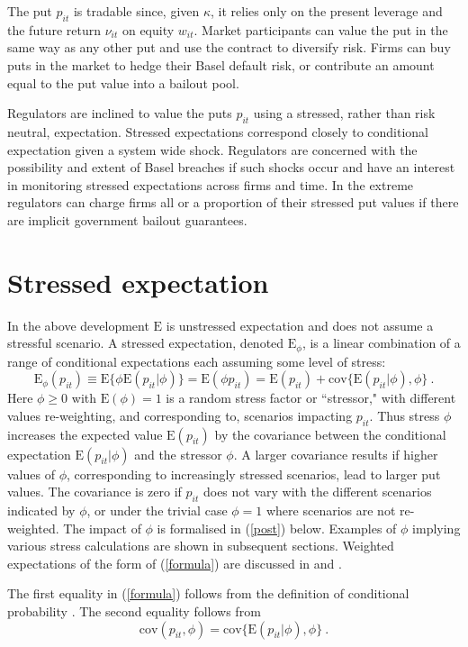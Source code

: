 \documentclass[12pt]{article}
\newcommand{\E}{\mathrm{E}}
\newcommand{\cov}{\mathrm{cov}}
\newcommand{\Es}{\E_\phi}
\newcommand{\eref}[1]{(\ref{#1})}
\newcommand{\be}[1]{\begin{equation}\label{#1}}
\newcommand{\ee}{\end{equation}}
\begin{document}
The put $p_{it}$ is tradable since, given $\kappa$, it relies only on the present leverage and the future return $\nu_{it}$ on equity $w_{it}$.  Market participants can value the put in  the same way as any other put and use the contract to diversify risk.  Firms can buy puts in the market to hedge their Basel default risk, or contribute an amount equal to the put value into a bailout pool.

Regulators are inclined to value the puts $p_{it}$ using a stressed, rather than risk neutral, expectation.   Stressed expectations correspond closely to conditional expectation given a system wide shock.    Regulators are concerned with the possibility and extent of Basel breaches if such shocks occur and  have an  interest in monitoring stressed expectations across firms and time.   In the extreme regulators can charge firms all or a  proportion of their stressed put values if there are implicit government bailout guarantees.



\section{Stressed expectation}

In the above development $\E$  is  unstressed expectation and does not assume a stressful scenario.   A stressed expectation, denoted $\Es$, is a
linear combination of a range of conditional expectations each assuming some level of stress:
\be{formula}
 \Es(p_{it}) \equiv \E\{\phi\E(p_{it}|\phi)\} = \E(\phi p_{it}) = \E(p_{it}) + \cov\{\E(p_{it}|\phi),\phi\}\ .
\ee
Here $\phi\ge 0$ with $\E(\phi)=1$ is a random stress factor or ``stressor,"  with different values re-weighting, and corresponding to, scenarios impacting $p_{it}$.  Thus stress $\phi$ increases the expected value $\E(p_{it})$ by the covariance between the conditional expectation $\E(p_{it}|\phi)$  and the stressor $\phi$. A larger covariance results if higher values of $\phi$, corresponding to increasingly stressed scenarios, lead to larger put values. The covariance is zero if $p_{it}$ does not vary with the different scenarios indicated by $\phi$, or under the trivial case $\phi=1$ where scenarios are not re-weighted. The impact of $\phi$ is formalised in \eref{post} below. Examples of $\phi$ implying various stress calculations are shown in subsequent sections. Weighted expectations of the form of \eref{formula} are discussed in \cite{furman2008weighted1} and \cite{choo2010determining}.

The first equality in \eref{formula} follows from the definition of conditional probability \citep{whittle2000probability}.  The second equality follows from
$$
\cov(p_{it},\phi)=\cov\{\E(p_{it}|\phi),\phi\}\ .
$$
\end{document}
